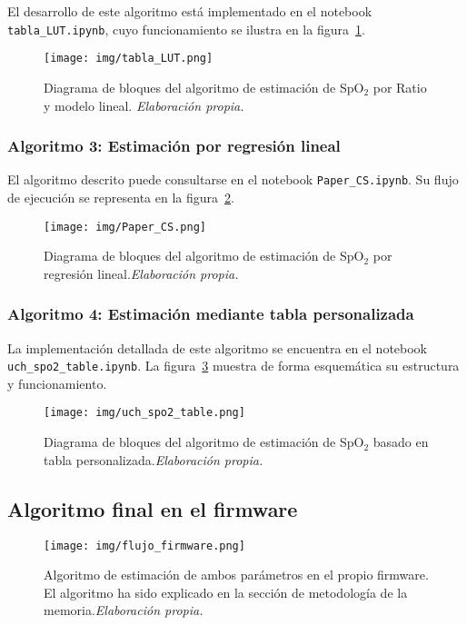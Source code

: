 El desarrollo de este algoritmo está implementado en el notebook \texttt{tabla\_LUT.ipynb}, cuyo funcionamiento se ilustra en la figura~\ref{fig:tabla_LUT2}.


\begin{figure}[H]
    \centering
    \texttt{[image: img/tabla\_LUT.png]}
    \caption{Diagrama de bloques del algoritmo de estimación de SpO$_2$ por Ratio y modelo lineal. \textit{Elaboración propia.}}
    \label{fig:tabla_LUT2}
\end{figure}


\subsubsection{Algoritmo 3: Estimación por regresión lineal}

El algoritmo descrito puede consultarse en el notebook \texttt{Paper\_CS.ipynb}. Su flujo de ejecución se representa en la figura~\ref{fig: Paper_CS2}.

\begin{figure}[H]
    \centering
    \texttt{[image: img/Paper\_CS.png]}
    \caption{Diagrama de bloques del algoritmo de estimación de SpO$_2$ por regresión lineal.\textit{Elaboración propia.}}
    \label{fig: Paper_CS2}
\end{figure}

\subsubsection{Algoritmo 4: Estimación mediante tabla personalizada}

La implementación detallada de este algoritmo se encuentra en el notebook \texttt{uch\_spo2\_table.ipynb}. La figura~\ref{fig: uch_spo2_table2} muestra de forma esquemática su estructura y funcionamiento.

\begin{figure}[H]
    \centering
    \texttt{[image: img/uch\_spo2\_table.png]}
    \caption{Diagrama de bloques del algoritmo de estimación de SpO$_2$ basado en tabla personalizada.\textit{Elaboración propia.}}
    \label{fig: uch_spo2_table2}
\end{figure}

\newpage

\subsection{Algoritmo final en el firmware}


\begin{figure}[H]
    \centering
    \texttt{[image: img/flujo\_firmware.png]}
    \caption{Algoritmo de estimación de ambos parámetros en el propio firmware. El algoritmo ha sido explicado en la sección de metodología de la memoria.\textit{Elaboración propia.}}
    \label{fig:flujo_firmware}
\end{figure}